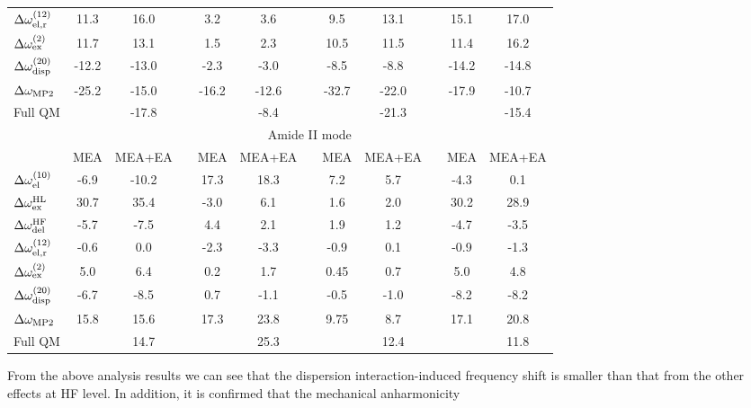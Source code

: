 \documentclass[a4paper,titlepage,twoside,fleqn,12pt]{book}
\begin{document}
\begin{refsection}
\begin{table}[t!]
\begin{tabular*}{1.0\textwidth}{@{\extracolsep{\fill} } l ccccccccccc }
 $\Delta \omega_{{\rm el,r}}^{(12)}$    &  11.3  &  16.0   &&   3.2  &   3.6   &&   9.5  &  13.1  &&  15.1 &  17.0 \\
 $\Delta \omega_{{\rm ex}}^{(2)}$       &  11.7  &  13.1   &&   1.5  &   2.3   &&  10.5  &  11.5  &&  11.4 &  16.2 \\
 $\Delta \omega_{{\rm disp}}^{(20)}$    & -12.2  & -13.0   &&  -2.3  &  -3.0   &&  -8.5  &  -8.8  && -14.2 & -14.8 \\
 $\Delta \omega_{\rm MP2}$              & -25.2  & -15.0   &&  -16.2 & -12.6   && -32.7  & -22.0  && -17.9 & -10.7 \\
 Full QM                                &        & -17.8   &&        &  -8.4   &&        & -21.3  &&       & -15.4 \\
\hline
 & \multicolumn{11}{c}{Amide II mode} \\
\cline{2-12}
 & MEA & MEA+EA &&  MEA & MEA+EA && MEA & MEA+EA && MEA & MEA+EA \\
\hline
 $\Delta \omega_{{\rm el}}^{(10)}$      &  -6.9  & -10.2   &&  17.3  &  18.3   &&   7.2  &   5.7  &&  -4.3 &   0.1 \\
 $\Delta \omega_{{\rm ex}}^{\rm HL}$    &  30.7  &  35.4   &&  -3.0  &   6.1   &&   1.6  &   2.0  &&  30.2 &  28.9 \\
 $\Delta \omega_{{\rm del}}^{\rm HF}$   &  -5.7  &  -7.5   &&   4.4  &   2.1   &&   1.9  &   1.2  &&  -4.7 &  -3.5 \\
 $\Delta \omega_{{\rm el,r}}^{(12)}$    &  -0.6  &   0.0   &&  -2.3  &  -3.3   &&  -0.9  &   0.1  &&  -0.9 &  -1.3 \\
 $\Delta \omega_{{\rm ex}}^{(2)}$       &   5.0  &   6.4   &&   0.2  &   1.7   &&   0.45 &   0.7  &&   5.0 &   4.8 \\
 $\Delta \omega_{{\rm disp}}^{(20)}$    &  -6.7  &  -8.5   &&   0.7  &  -1.1   &&  -0.5  &  -1.0  &&  -8.2 &  -8.2 \\
 $\Delta \omega_{\rm MP2}$              &  15.8  &  15.6   &&  17.3  &  23.8   &&   9.75 &   8.7  &&  17.1 &  20.8 \\
 Full QM                                &        &  14.7   &&        &  25.3   &&        &  12.4  &&       &  11.8 \\
\hline\hline
\end{tabular*}
\end{table}
%
From the above analysis results we can see that the dispersion
interaction\hyp{}induced frequency shift is smaller than that from
the other effects at HF level. In
addition, it is confirmed that
the mechanical anharmonicity

\end{refsection}
\end{document}
